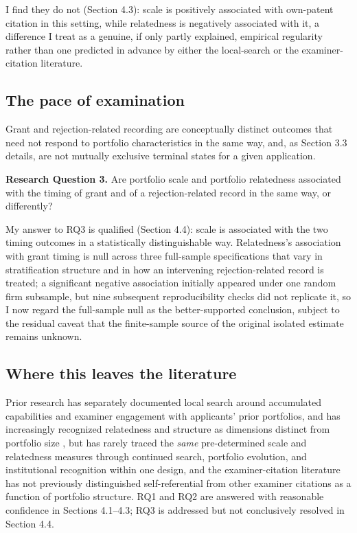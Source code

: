\documentclass[12pt]{article}
\begin{document}
\medskip
\noindent I find they do not (Section 4.3): scale is positively associated with own-patent citation in this setting, while relatedness is negatively associated with it, a difference I treat as a genuine, if only partly explained, empirical regularity rather than one predicted in advance by either the local-search or the examiner-citation literature.

\subsection{The pace of examination}

Grant and rejection-related recording are conceptually distinct outcomes that need not respond to portfolio characteristics in the same way, and, as Section 3.3 details, are not mutually exclusive terminal states for a given application.

\medskip
\noindent \textbf{Research Question 3.} Are portfolio scale and portfolio relatedness associated with the timing of grant and of a rejection-related record in the same way, or differently?

\medskip
\noindent My answer to RQ3 is qualified (Section 4.4): scale is associated with the two timing outcomes in a statistically distinguishable way. Relatedness's association with grant timing is null across three full-sample specifications that vary in stratification structure and in how an intervening rejection-related record is treated; a significant negative association initially appeared under one random firm subsample, but nine subsequent reproducibility checks did not replicate it, so I now regard the full-sample null as the better-supported conclusion, subject to the residual caveat that the finite-sample source of the original isolated estimate remains unknown.

\subsection{Where this leaves the literature}

Prior research has separately documented local search around accumulated capabilities and examiner engagement with applicants' prior portfolios, and has increasingly recognized relatedness and structure as dimensions distinct from portfolio size \citep{lishuying2020, zhai2021, lilanhua2025}, but has rarely traced the \emph{same} pre-determined scale and relatedness measures through continued search, portfolio evolution, and institutional recognition within one design, and the examiner-citation literature \citep{alcacergittelman2006, alcacer2009} has not previously distinguished self-referential from other examiner citations as a function of portfolio structure. RQ1 and RQ2 are answered with reasonable confidence in Sections 4.1--4.3; RQ3 is addressed but not conclusively resolved in Section 4.4.
\end{document}
